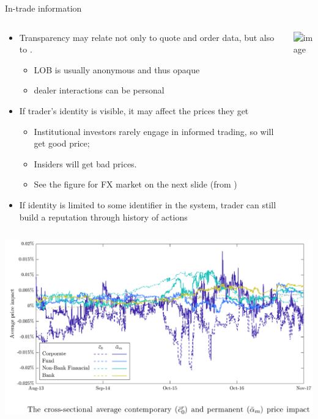 \documentclass[english,10pt
,aspectratio=169
]{beamer}
\begin{document}
\begin{frame}{In-trade information}
	\begin{columns}
		\begin{column}{0.7\linewidth}
			{
				\begin{itemize}
					\item Transparency may relate not only to quote and order data, but also to .
					\begin{itemize}
						\item LOB is usually anonymous and thus opaque
						\item dealer interactions can be personal
					\end{itemize}
					\pause
					\item If trader's identity is visible, it may affect the prices they get
					\begin{itemize}
						\item Institutional investors rarely engage in informed trading, so will get good price;
						\item Insiders will get bad prices.
						\item See the figure for FX market on the next slide (from \cite{ranaldo_asymmetric_2019})
					\end{itemize}
					\pause
					\item If identity is limited to some identifier in the system, trader can still build a reputation through history of actions
				\end{itemize}
			}
		\end{column}
		\begin{column}{0.3\linewidth}
			\pause[1]
			\includegraphics<handout:0>[width=\linewidth]{pics/incognito}
		\end{column}
	\end{columns}
\end{frame}


\begin{frame}
	\includegraphics[width=\linewidth]{pics/RS}
\end{frame}
\end{document}
